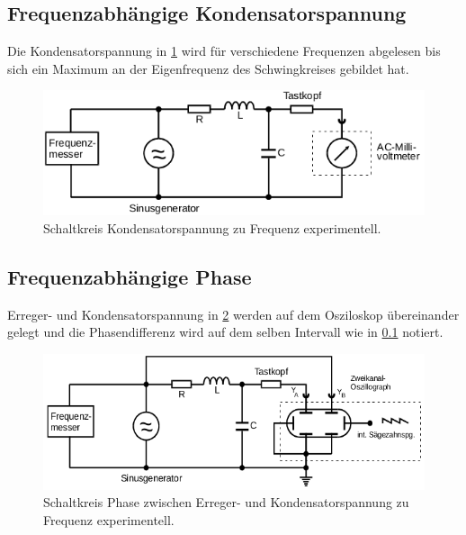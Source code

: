 \subsection{Frequenzabhängige Kondensatorspannung}
\label{sec:d3}
Die Kondensatorspannung in \ref{fig:d3} wird für verschiedene Frequenzen abgelesen bis sich ein
Maximum an der Eigenfrequenz des Schwingkreises gebildet hat.
\begin{figure}[H]
  \centering
  \includegraphics{content/images/d3.png}
  \caption{Schaltkreis Kondensatorspannung zu Frequenz experimentell.}
  \label{fig:d3}
\end{figure}

\subsection{Frequenzabhängige Phase}
Erreger- und Kondensatorspannung in \ref{fig:d4} werden auf dem Osziloskop übereinander gelegt
und die Phasendifferenz wird auf dem selben Intervall wie in \ref{sec:d3} notiert.
\begin{figure}[H]
  \centering
  \includegraphics{content/images/d4.png}
  \caption{Schaltkreis Phase zwischen Erreger- und Kondensatorspannung zu Frequenz experimentell.}
  \label{fig:d4}
\end{figure}
